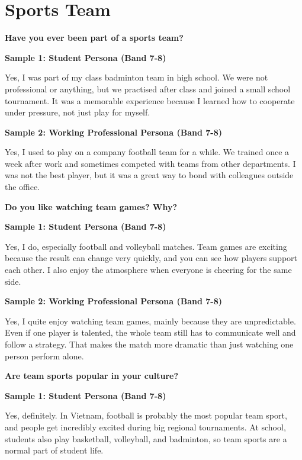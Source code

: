 \section{Sports Team}
\begin{ieltsquestion}
\textbf{Have you ever been part of a sports team?}
\end{ieltsquestion}
\textbf{Sample 1: Student Persona (Band 7-8)}

Yes, I was part of my class badminton team in high school. We were not professional or anything, but we practised after class and joined a small school tournament. It was a memorable experience because I learned how to cooperate under pressure, not just play for myself.

\textbf{Sample 2: Working Professional Persona (Band 7-8)}

Yes, I used to play on a company football team for a while. We trained once a week after work and sometimes competed with teams from other departments. I was not the best player, but it was a great way to bond with colleagues outside the office.

\separator

\begin{ieltsquestion}
\textbf{Do you like watching team games? Why?}
\end{ieltsquestion}
\textbf{Sample 1: Student Persona (Band 7-8)}

Yes, I do, especially football and volleyball matches. Team games are exciting because the result can change very quickly, and you can see how players support each other. I also enjoy the atmosphere when everyone is cheering for the same side.

\textbf{Sample 2: Working Professional Persona (Band 7-8)}

Yes, I quite enjoy watching team games, mainly because they are unpredictable. Even if one player is talented, the whole team still has to communicate well and follow a strategy. That makes the match more dramatic than just watching one person perform alone.

\separator

\begin{ieltsquestion}
\textbf{Are team sports popular in your culture?}
\end{ieltsquestion}
\textbf{Sample 1: Student Persona (Band 7-8)}

Yes, definitely. In Vietnam, football is probably the most popular team sport, and people get incredibly excited during big regional tournaments. At school, students also play basketball, volleyball, and badminton, so team sports are a normal part of student life.


